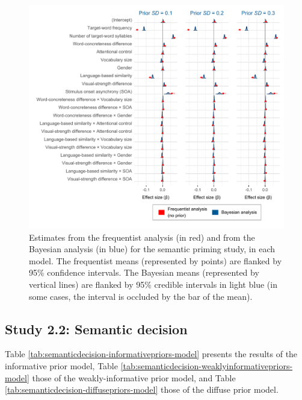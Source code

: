 \documentclass[
  12pt,
  man,floatsintext]{apa7}
\begin{document}
\begin{figure}

{\centering \includegraphics[width=1\linewidth]{../semanticpriming/frequentist_bayesian_plots/plots/semanticpriming_frequentist_bayesian_plot_allpriors_exgaussian} 

}

\caption{Estimates from the frequentist analysis (in red) and from the Bayesian analysis (in blue) for the semantic priming study, in each model. The frequentist means (represented by points) are flanked by 95\% confidence intervals. The Bayesian means (represented by vertical lines) are flanked by 95\% credible intervals in light blue (in some cases, the interval is occluded by the bar of the mean).}\label{fig:semanticpriming-frequentist-bayesian-plot-allpriors-exgaussian}
\end{figure}

\clearpage

\hypertarget{study-2.2-semantic-decision-5}{%
\subsection{Study 2.2: Semantic decision}\label{study-2.2-semantic-decision-5}}

Table \ref{tab:semanticdecision-informativepriors-model} presents the results of the informative prior model, Table \ref{tab:semanticdecision-weaklyinformativepriors-model} those of the weakly-informative prior model, and Table \ref{tab:semanticdecision-diffusepriors-model} those of the diffuse prior model.
\end{document}
